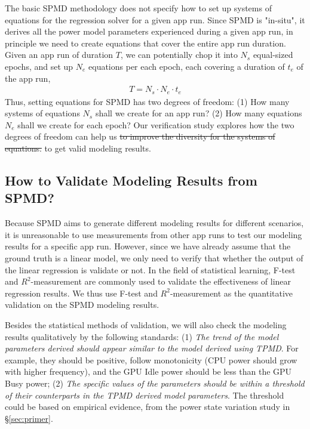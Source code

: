 The basic SPMD methodology does not specify how to set up systems of
equations for the regression solver for a given app run. Since SPMD is
"in-situ", \ie it derives all the power model parameters experienced
during a given app run, in principle we need to create equations that
cover the entire app run duration.  Given an app run of duration
$T$, we can potentially chop it into $N_s$ equal-sized epochs, and
set up $N_e$ equations per each epoch, each covering a duration of
$t_e$ of the app run, \ie
\begin{eqnarray}
T = N_s \cdot N_e \cdot t_e
\end{eqnarray}
%
Thus, setting equations for SPMD has two degrees of freedom: 
(1) How many systems of equations $N_s$ shall we create for an app run? 
(2) How many equations $N_e$ shall we create for each epoch?
Our verification study explores how the two degrees of freedom can 
help us \st{to improve the diversity for the systems of equations.}{\color{blue} to get valid modeling results.}



\subsection{How to Validate Modeling Results from SPMD?}
\label{subsec:validate}

{\color{blue}Because SPMD aims to generate different modeling results for different scenarios, it is unreasonable to use measurements from other app runs to test our modeling results for a specific app run. However, since we have already assume that the ground truth is a linear model, we only need to verify that whether the output of the linear regression is validate or not. In the field of statistical learning, F-test and $R^2$-measurement are commonly used to validate the effectiveness of linear regression results. We thus use F-test and $R^2$-measurement as the quantitative validation on the SPMD modeling results.}

{\color{blue}Besides the statistical methods of validation, we will also check the modeling results qualitatively by the following standards:}
(1) {\em The trend of the model parameters derived should appear similar to
the model derived using TPMD}. For example, they should be positive,
follow monotonicity (\eg CPU power should grow with higher frequency),
and the GPU Idle power should be less than the GPU Busy power;
%
(2) {\em The specific values of the parameters should be within a threshold
of their counterparts in the TPMD derived model
parameters}. The threshold could be based on empirical evidence, \eg
from the power state variation study in \S\ref{sec:primer}.


